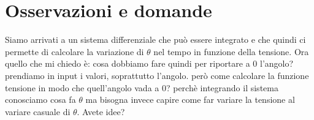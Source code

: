 \documentclass[12pt,a4paper,twoside, openright]{scrartcl}
\begin{document}
\section{Osservazioni e domande}
	Siamo arrivati a un sistema differenziale che può essere integrato e che quindi ci permette di calcolare la variazione di $\theta$ nel tempo in funzione della tensione. Ora quello che mi chiedo è: 
	cosa dobbiamo fare quindi per riportare a 0 l'angolo?  prendiamo in input i valori, soprattutto l'angolo. però come calcolare la funzione tensione in modo che quell'angolo vada a 0?
	perchè integrando il sistema conosciamo cosa fa $\theta$ ma bisogna invece capire come far variare la tensione al variare casuale di $\theta$. Avete idee? 
	
\end{document}
